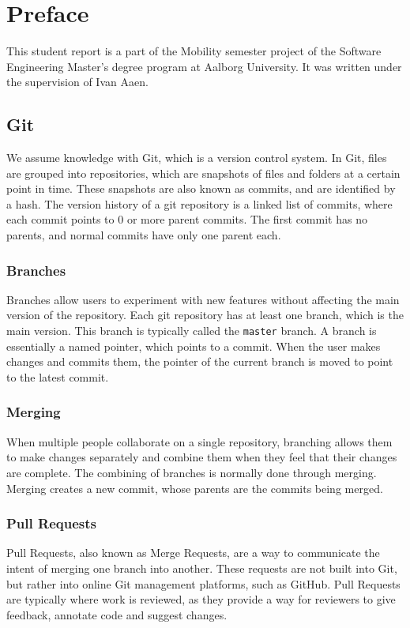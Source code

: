 \chapter*{Preface}
This student report is a part of the Mobility semester project of the Software Engineering Master's degree program at Aalborg University.
It was written under the supervision of Ivan Aaen.

\section*{Git}

We assume knowledge with Git\cite{git}, which is a version control system.
In Git, files are grouped into repositories, which are snapshots of files and folders at a certain point in time.
These snapshots are also known as commits, and are identified by a hash.
The version history of a git repository is a linked list of commits, where each commit points to 0 or more parent commits.
The first commit has no parents, and normal commits have only one parent each.

\subsection*{Branches}
Branches allow users to experiment with new features without affecting the main version of the repository.
Each git repository has at least one branch, which is the main version.
This branch is typically called the \texttt{master} branch.
A branch is essentially a named pointer, which points to a commit.
When the user makes changes and commits them, the pointer of the current branch is moved to point to the latest commit.

\subsection*{Merging}
When multiple people collaborate on a single repository, branching allows them to make changes separately and combine them when they feel that their changes are complete.
The combining of branches is normally done through merging.
Merging creates a new commit, whose parents are the commits being merged.

\subsection*{Pull Requests}
Pull Requests, also known as Merge Requests, are a way to communicate the intent of merging one branch into another.
These requests are not built into Git, but rather into online Git management platforms, such as GitHub.
Pull Requests are typically where work is reviewed, as they provide a way for reviewers to give feedback, annotate code and suggest changes.

